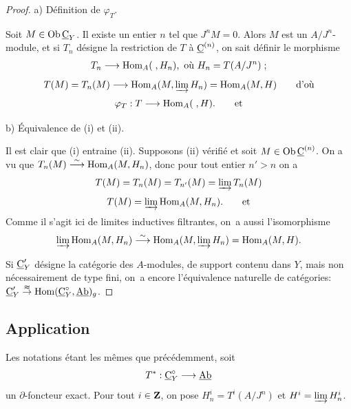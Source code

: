 \begin{proof}
a) D\'efinition de $\varphi_{T}$.

Soit $M\in \operatorname{Ob} \underline{\mathrm{C}}_{Y}$. Il existe un entier $n$ tel que $J^{n}M=0$. Alors $M$ est un $A/J^{n}$-module, et si $T_{n}$ d\'esigne la restriction de $T$ \`a $\underline{\mathrm{C}}^{(n)}$, on sait d\'efinir le morphisme
\begin{eqnarray*}
T_{n}\to \Hom_{A}(\;, H_{n}), \ \hbox{où}\ H_{n}=T(A/J^{n})\;;
\end{eqnarray*}
\begin{equation*} {T(M)=T_{n}(M)\to \Hom_{A}(M, \varinjlim H_{n})= \Hom_{A}(M, H)}\tag*{d'où}
\end{equation*}
\begin{equation*} \varphi_{T}: T\to \Hom_{A}(\;, H).\tag*{et}
\end{equation*}

b) \'Equivalence de (i) et (ii).

Il est clair que (i) entraine (ii). Supposons (ii) v\'erifi\'e et soit $M\in \operatorname{Ob} \underline{\mathrm{C}}^{(n)}$. On a vu que $T_{n}(M)\overset{\sim}{\longrightarrow} \operatorname{Hom}_{A}(M, H_{n})$, donc pour tout entier $n'>n$ on a
\begin{equation*} T(M)=T_{n}(M)=T_{n'}(M)=\varinjlim T_{n}(M)
\end{equation*}
\begin{equation*} T(M)=\varinjlim \operatorname{Hom}_{A}(M, H_{n}).\tag*{et}
\end{equation*}
Comme il s'agit ici de limites inductives filtrantes, on~a aussi l'isomorphisme
\begin{equation*} \varinjlim \operatorname{Hom}_{A}(M, H_{n})\overset{\sim}{\longrightarrow} \operatorname{Hom}_{A}(M, \varinjlim H_{n}) = \operatorname{Hom}_{A}(M, H).
\end{equation*}

Si $\underline{\mathrm{C}}'_{Y}$ d\'esigne la cat\'egorie des $A$-modules, de support contenu dans $Y$, mais non n\'ecessairement de type fini, on~a encore l'\'equivalence naturelle de cat\'egories: \hbox{$\ccat'_{Y}\overset{\thickapprox}{\to} \Hom (\ccat_{Y}^{\circ}, \Ab)_{g}$}.
\skipqed
\end{proof}

\subsection*{Application}
Les notations \'etant les m\^emes que pr\'ec\'edemment, soit
\begin{equation*} T^{*}:\ccat_{Y}^{\circ}\to{\Ab}
\end{equation*}
un $\partial$-foncteur exact. Pour tout $i\in \mathbf{Z}$, on pose $H^{i}_{n}=T^{i}(A/J^{n})$ et $H^{i}=\varinjlim H^{i}_{n}$.

